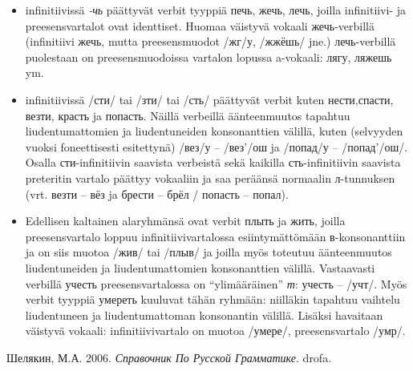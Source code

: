 \documentclass[]{scrartcl}
\providecommand{\tightlist}{%
  \setlength{\itemsep}{0pt}\setlength{\parskip}{0pt}}
\begin{document}
\begin{itemize}
\tightlist
\item
  infinitiivissä \emph{-чь} päättyvät verbit tyyppiä печь, жечь, лечь,
  joilla infinitiivi- ja preesensvartalot ovat identtiset. Huomaa
  väistyvä vokaali жечь-verbillä (infinitiivi жечь, mutta preesensmuodot
  /жг/у, /жжёшь/ jne.) лечь-verbillä puolestaan on preesensmuodoissa
  vartalon lopussa a-vokaali: лягу, ляжешь ym.
\item
  infinitiivissä /сти/ tai /зти/ tai /сть/ päättyvät verbit kuten
  нести,спасти, везти, красть ja попасть. Näillä verbeillä äänteenmuutos
  tapahtuu liudentumattomien ja liudentuneiden konsonanttien välillä,
  kuten (selvyyden vuoksi foneettisesti esitettynä) /вез/у -- /вез'/ош
  ja /попад/у -- /попад'/ош/. Osalla сти-infinitiivin saavista verbeistä
  sekä kaikilla сть-infinitiivin saavista preteritin vartalo päättyy
  vokaaliin ja saa peräänsä normaalin л-tunnuksen (vrt. везти -- вёз ja
  брести -- брёл / попасть -- попал).
\item
  Edellisen kaltainen alaryhmänsä ovat verbit плыть ja жить, joilla
  preesensvartalo loppuu infinitiivivartalossa esiintymättömään
  в-konsonanttiin ja on siis muotoa /жив/ tai /плыв/ ja joilla myös
  toteutuu äänteenmuutos liudentuneiden ja liudentumattomien
  konsonanttien välillä. Vastaavasti verbillä учесть preesensvartalossa
  on ``ylimääräinen'' \emph{т}: учесть -- /учт/. Myös verbit tyyppiä
  умереть kuuluvat tähän ryhmään: niilläkin tapahtuu vaihtelu
  liudentuneen ja liudentumattoman konsonantin välillä. Lisäksi
  havaitaan väistyvä vokaali: infinitiivivartalo on muotoa /умере/,
  preesensvartalo /умр/.
\end{itemize}

Шелякин, М.А. 2006. \emph{Справочник По Русской Грамматике}. drofa.
\end{document}
